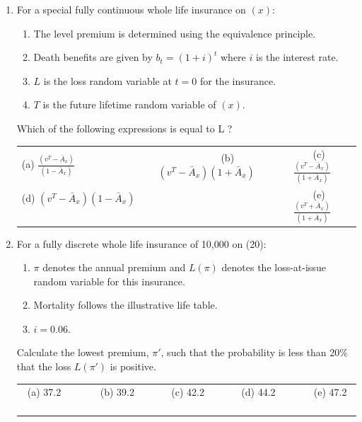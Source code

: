 \documentclass[11pt,fleqn,oneside]{book}
\begin{document}
\begin{enumerate}
\item For a special fully continuous whole life insurance on $(x)$:
\begin{enumerate}
\item The level premium is determined using the equivalence principle. 
\item Death benefits are given by $b_t = (1+i)^t$ where $i$ is the interest rate.
\item  $L$ is the loss random variable at $t=0$ for the insurance. 
\item $T$ is the future lifetime random variable of $(x)$.
\end{enumerate}
Which of the following expressions is equal to L ?%

\small
\begin{center}
\begin{tabular}{l c l}
(a) $\frac{(v^T - \bar{A}_x)}{(1-\bar{A}_x)}$ $\;\;\;\;\;\;\;$ & 
$\;\;\;\;\;\;\;$(b) ${(v^T - \bar{A}_x)}{(1+\bar{A}_x)}$  $\;\;\;\;\;\;\;$ &
$\;\;\;\;\;\;\;$(c) $\frac{(v^T - \bar{A}_x)}{(1+\bar{A}_x)}$ \\
(d) ${(v^T - \bar{A}_x)}{(1-\bar{A}_x)}$ $\;\;\;\;\;\;\;$ & &
$\;\;\;\;\;\;\;$(e) $\frac{(v^T + \bar{A}_x)}{(1+\bar{A}_x)}$  
\end{tabular}
\end{center}
\normalsize

\item  For a fully discrete whole life insurance of 10,000 on (20):
\begin{enumerate}
\item $\pi$ denotes the annual premium and $L(\pi)$ denotes the loss-at-issue random variable for this insurance. 
\item Mortality follows the illustrative life table.
\item $i=0.06$.
\end{enumerate}
Calculate the lowest premium, $\pi'$, such that the probability is less than 20\% that the loss $L(\pi')$ is positive.%


\small
\begin{center}
\begin{tabular}{c c c c c}
(a) 37.2$\;\;\;\;\;\;\;$ & 
$\;\;\;\;\;\;\;$(b) 39.2 $\;\;\;\;\;\;\;$ &
$\;\;\;\;\;\;\;$(c) 42.2$\;\;\;\;\;\;\;$ & 
$\;\;\;\;\;\;\;$(d) 44.2 $ \;\;\;\;\;\;\;$ &
$\;\;\;\;\;\;\;$(e) 47.2 $\;\;\;\;\;\;\;$ 
\end{tabular}
\end{center}

\end{enumerate}
\end{document}
